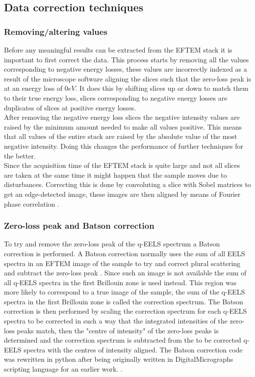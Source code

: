 \begin{multicols}{2}
\subsection{Data correction techniques}
\subsubsection{Removing/altering values}
Before any meaningful results can be extracted from the EFTEM stack it is important to first correct the data.
This process starts by removing all the values corresponding to negative energy losses, these values are incorrectly indexed as a result of the microscope software aligning the slices such that the zero-loss peak is at an energy loss of $0eV$.
It does this by shifting slices up or down to match them to their true energy loss, slices corresponding to negative energy losses are duplicates of slices at positive energy losses.\\
After removing the negative energy loss slices the negative intensity values are raised by the minimum amount needed to make all values positive.
This means that all values of the entire stack are raised by the absolute value of the most negative intensity. Doing this changes the performance of further techniques for the better.\\
Since the acquisition time of the EFTEM stack is quite large and not all slices are taken at the same time it might happen that the sample moves due to disturbances. Correcting this is done by convoluting a slice with Sobel matrices to get an edge-detected image, these images are then aligned by means of Fourier phase correlation \cite{Sjodahl:93}.\\
%
\subsubsection{Zero-loss peak and Batson correction}
\label{sec:batsen}
To try and remove the zero-loss peak of the q-EELS spectrum a Batson correction is performed. A Batson correction normally uses the sum of all EELS spectra in an EFTEM image of the sample to try and correct plural scattering and subtract the zero-loss peak \cite{PhysRevB.27.5224}. Since such an image is not available the sum of all q-EELS spectra in the first Brillouin zone is used instead. This region was more likely to correspond to a true image of the sample, the sum of the q-EELS spectra in the first Brillouin zone is called the correction spectrum.
The Batson correction is then performed by scaling the correction spectrum for each q-EELS spectra to be corrected in such a way that the integrated intensities of the zero-loss peaks match, then the "centre of intensity" of the zero-loss peaks is determined and the correction spectrum is subtracted from the to be corrected q-EELS spectra with the centres of intensity aligned.
The Batson correction code was rewritten in python after being originally written in DigitalMicrographs scripting language for an earlier work. \cite{Politano2017}.\\


\end{multicols}
